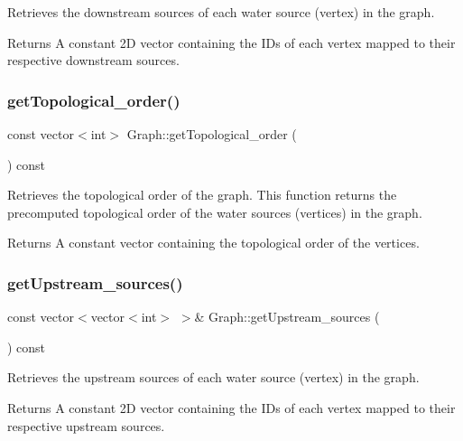 Retrieves the downstream sources of each water source (vertex) in the graph. 

\begin{DoxyReturn}{Returns}
A constant 2D vector containing the I\+Ds of each vertex mapped to their respective downstream sources. 
\end{DoxyReturn}
\mbox{\label{classGraph_a838b34813d6d5ddcfc9e452b357d98bd}} 
\subsubsection{\texorpdfstring{get\+Topological\+\_\+order()}{getTopological\_order()}}
{\footnotesize\ttfamily const vector$<$int$>$ Graph\+::get\+Topological\+\_\+order (\begin{DoxyParamCaption}{ }\end{DoxyParamCaption}) const}



Retrieves the topological order of the graph. This function returns the precomputed topological order of the water sources (vertices) in the graph. 

\begin{DoxyReturn}{Returns}
A constant vector containing the topological order of the vertices. 
\end{DoxyReturn}
\mbox{\label{classGraph_a1ae92c80c49d220aff1e04f653db1e9e}} 
\subsubsection{\texorpdfstring{get\+Upstream\+\_\+sources()}{getUpstream\_sources()}}
{\footnotesize\ttfamily const vector$<$vector$<$int$>$ $>$\& Graph\+::get\+Upstream\+\_\+sources (\begin{DoxyParamCaption}{ }\end{DoxyParamCaption}) const}



Retrieves the upstream sources of each water source (vertex) in the graph. 

\begin{DoxyReturn}{Returns}
A constant 2D vector containing the I\+Ds of each vertex mapped to their respective upstream sources. 
\end{DoxyReturn}
\mbox{\label{classGraph_a915f9d58884a00083bb6e5a256141fae}} 
